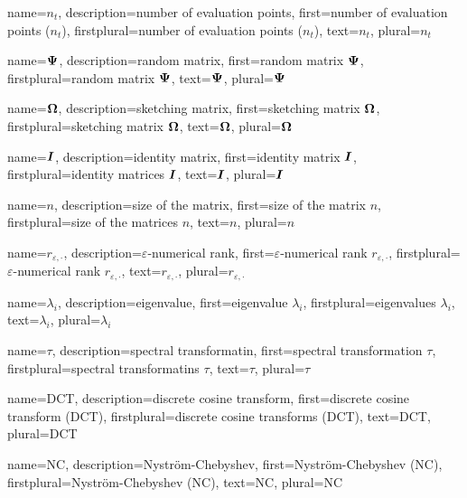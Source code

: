 {%
  name={$n_t$},%
  description={number of evaluation points},%
  first={number of evaluation points ($n_t$)},%
  firstplural={number of evaluation points ($n_t$)},%
  text={$n_t$},%
  plural={$n_t$}%
}

{%
  name={$\boldsymbol{\Psi}$},%
  description={random matrix},%
  first={random matrix $\boldsymbol{\Psi}$},%
  firstplural={random matrix $\boldsymbol{\Psi}$},%
  text={$\boldsymbol{\Psi}$},%
  plural={$\boldsymbol{\Psi}$}%
}

{%
  name={$\boldsymbol{\Omega}$},%
  description={sketching matrix},%
  first={sketching matrix $\boldsymbol{\Omega}$},%
  firstplural={sketching matrix $\boldsymbol{\Omega}$},%
  text={$\boldsymbol{\Omega}$},%
  plural={$\boldsymbol{\Omega}$}%
}

{%
  name={$\boldsymbol{I}$},%
  description={identity matrix},%
  first={identity matrix $\boldsymbol{I}$},%
  firstplural={identity matrices $\boldsymbol{I}$},%
  text={$\boldsymbol{I}$},%
  plural={$\boldsymbol{I}$}%
}

{%
  name={$n$},%
  description={size of the matrix},%
  first={size of the matrix $n$},%
  firstplural={size of the matrices $n$},%
  text={$n$},%
  plural={$n$}%
}

{%
  name={$r_{\varepsilon, \cdot}$},%
  description={$\varepsilon$-numerical rank},%
  first={$\varepsilon$-numerical rank $r_{\varepsilon, \cdot}$},%
  firstplural={$\varepsilon$-numerical rank $r_{\varepsilon, \cdot}$},%
  text={$r_{\varepsilon, \cdot}$},%
  plural={$r_{\varepsilon, \cdot}$}%
}

{%
  name={$\lambda_i$},%
  description={eigenvalue},%
  first={eigenvalue $\lambda_i$},%
  firstplural={eigenvalues $\lambda_i$},%
  text={$\lambda_i$},%
  plural={$\lambda_i$}%
}

{%
  name={$\tau$},%
  description={spectral transformatin},%
  first={spectral transformation $\tau$},%
  firstplural={spectral transformatins $\tau$},%
  text={$\tau$},%
  plural={$\tau$}%
}

{%
  name={DCT},%
  description={discrete cosine transform},%
  first={discrete cosine transform (DCT)},%
  firstplural={discrete cosine transforms (DCT)},%
  text={DCT},%
  plural={DCT}%
}

{%
  name={NC},%
  description={Nystr\"om-Chebyshev},%
  first={Nystr\"om-Chebyshev (NC)},%
  firstplural={Nystr\"om-Chebyshev (NC)},%
  text={NC},%
  plural={NC}%
}

